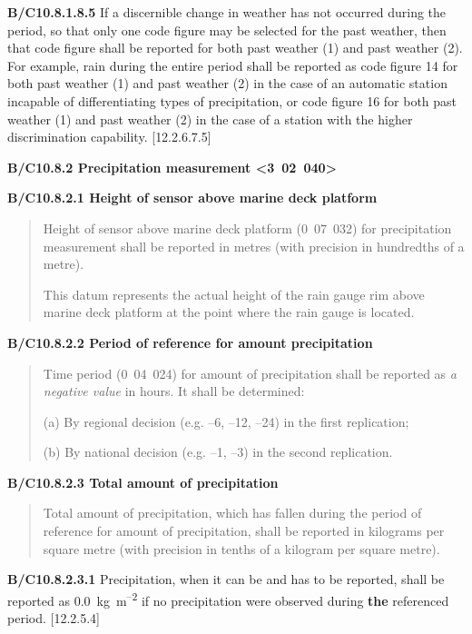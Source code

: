 \textbf{B/C10.8.1.8.5} If a discernible change in weather has not occurred during the period, so that only one code figure may be selected for the past weather, then that code figure shall be reported for both past weather (1) and past weather (2). For example, rain during the entire period shall be reported as code figure 14 for both past weather (1) and past weather (2) in the case of an automatic station incapable of differentiating types of precipitation, or code figure 16 for both past weather (1) and past weather (2) in the case of a station with the higher discrimination capability. {[}12.2.6.7.5{]}

\textbf{B/C10.8.2 Precipitation measurement \textless3~02~040\textgreater{}}

\textbf{B/C10.8.2.1 Height of sensor above marine deck platform}

\begin{quote}
Height of sensor above marine deck platform (0~07~032) for precipitation measurement shall be reported in metres (with precision in hundredths of a metre).

This datum represents the actual height of the rain gauge rim above marine deck platform at the point where the rain gauge is located.
\end{quote}

\textbf{B/C10.8.2.2 Period of reference for amount precipitation}

\begin{quote}
Time period (0~04~024) for amount of precipitation shall be reported as \emph{a negative value} in hours. It shall be determined:

(a) By regional decision (e.g. --6, --12, --24) in the first replication;

(b) By national decision (e.g. --1, --3) in the second replication.
\end{quote}

\textbf{B/C10.8.2.3 Total amount of precipitation}

\begin{quote}
Total amount of precipitation, which has fallen during the period of reference for amount of precipitation, shall be reported in kilograms per square metre (with precision in tenths of a kilogram per square metre).
\end{quote}

\textbf{B/C10.8.2.3.1} Precipitation, when it can be and has to be reported, shall be reported as 0.0~kg~m\textsuperscript{--2} if no precipitation were observed during \textbf{the} referenced period. {[}12.2.5.4{]}

